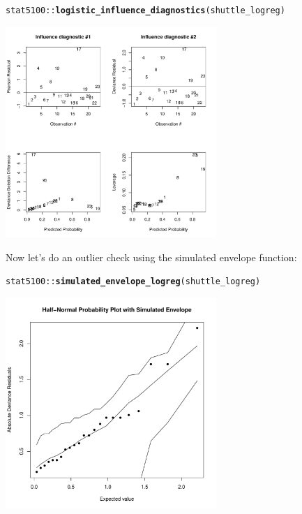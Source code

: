 \documentclass{article}\usepackage[]{graphicx}\usepackage[]{color}
\makeatletter
\newcommand{\hlopt}[1]{\textcolor[rgb]{0,0,0}{#1}}%
\newcommand{\hlstd}[1]{\textcolor[rgb]{0.345,0.345,0.345}{#1}}%
\newcommand{\hlkwd}[1]{\textcolor[rgb]{0.737,0.353,0.396}{\textbf{#1}}}%
\newenvironment{kframe}{%
 \def\at@end@of@kframe{}%
 \ifinner\ifhmode%
  \def\at@end@of@kframe{\end{minipage}}%
  \begin{minipage}{\columnwidth}%
 \fi\fi%
 \def\FrameCommand##1{\hskip\@totalleftmargin \hskip-\fboxsep
 \colorbox{shadecolor}{##1}\hskip-\fboxsep
     \hskip-\linewidth \hskip-\@totalleftmargin \hskip\columnwidth}%
 \MakeFramed {\advance\hsize-\width
   \@totalleftmargin\z@ \linewidth\hsize
   \@setminipage}}%
 {\par\unskip\endMakeFramed%
 \at@end@of@kframe}
\newenvironment{knitrout}{}{} %
\makeatother
\begin{document}
\begin{knitrout}
\color{fgcolor}\begin{kframe}
\begin{alltt}
\hlstd{stat5100}\hlopt{::}\hlkwd{logistic_influence_diagnostics}\hlstd{(shuttle_logreg)}
\end{alltt}
\end{kframe}

{\centering \includegraphics[width=0.6\textwidth]{figure/unnamed-chunk-5-1} 

}



\end{knitrout}

Now let's do an outlier check using the simulated envelope function:

\begin{knitrout}
\color{fgcolor}\begin{kframe}
\begin{alltt}
\hlstd{stat5100}\hlopt{::}\hlkwd{simulated_envelope_logreg}\hlstd{(shuttle_logreg)}
\end{alltt}


{\ttfamily\noindent\color{warningcolor}{\#\# Warning: glm.fit: fitted probabilities numerically 0 or 1 occurred}}\end{kframe}

{\centering \includegraphics[width=0.6\textwidth]{figure/unnamed-chunk-6-1} 

}



\end{knitrout}
\end{document}
